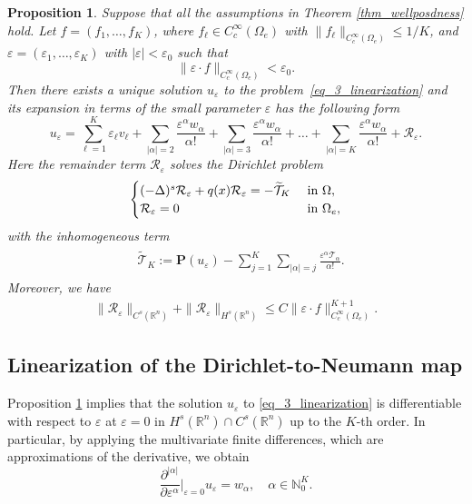 \documentclass [oneside,11pt] {amsart}
\numberwithin{equation}{section}
\newtheorem{prop}{Proposition}[section]
\newcommand{\R}{\mathbb{R}}
\newcommand{\p}{\partial}
\begin{document}
\begin{prop}\label{prop_linearization}Suppose that all the assumptions in Theorem \ref{thm_wellposdness} hold. 
Let $f=(f_1,\ldots,f_K)$, where $f_\ell\in C^\infty_c(\Omega_e)$ with $\|f_\ell\|_{C_c^\infty(\Omega_e)}\le 1/K$,
and $\varepsilon = (\varepsilon_1,\ldots,\varepsilon_K)$ with $|\varepsilon|<\varepsilon_0$ such that 
$$\|\varepsilon\cdot f\|_{C^\infty_c(\Omega_e)}<\varepsilon_0.$$
Then there exists a unique solution $u_\varepsilon$ to the problem~\eqref{eq_3_linearization} and its expansion in terms of the small parameter $\varepsilon$ has the following form 
\begin{equation}\label{eq_3_linear_u_expansion}
u_\varepsilon =  \sum_{\ell=1}^K\varepsilon_\ell v_\ell 
+ 
\sum_{|\alpha|=2}\frac{\varepsilon^\alpha w_\alpha}{\alpha!}
+ 
\sum_{|\alpha|=3}\frac{\varepsilon^\alpha w_\alpha}{\alpha!}+ \ldots+  \sum_{|\alpha|=K}\frac{\varepsilon^\alpha w_\alpha}{\alpha!}+\mathcal{R}_\varepsilon.
\end{equation}
Here the remainder term $\mathcal{R}_\varepsilon$ solves the Dirichlet problem 
\begin{align}\label{EQU_R}
\begin{cases}
(-\Delta)^s \mathcal{R}_\varepsilon + q(x)\mathcal{R}_\varepsilon =-\widetilde{\mathcal{T}}_{K} &\hbox{ in } \Omega,\\
\mathcal{R}_\varepsilon = 0 &\hbox{ in } \Omega_e,
\end{cases}
\end{align}
with the inhomogeneous term  
\begin{align*} 
\begin{aligned}
&\widetilde{\mathcal{T}}_{K} := \mathbf{P} (u_\varepsilon) -  \sum^K_{j=1} \sum_{|\alpha|=j}\frac{\varepsilon^\alpha \mathcal{T}_\alpha}{\alpha!}. 
\end{aligned}
\end{align*}
Moreover, we have 
\begin{align}\label{EST_R}
\|\mathcal{R}_\varepsilon\|_{C^{s}(\R^n)}+\|\mathcal{R}_\varepsilon\|_{H^{s}(\R^n)}\le  C\|\varepsilon\cdot f\|_{C^\infty_c(\Omega_e)}^{K+1}.
\end{align}
\end{prop}

\subsection{Linearization of the Dirichlet-to-Neumann map}
Proposition \ref{prop_linearization} implies that the solution $u_\varepsilon$ to \eqref{eq_3_linearization} is differentiable with respect to $\varepsilon$ at $\varepsilon = 0$ in $H^s(\R^n)\cap C^{s}(\R^n)$ up to the $K$-th order. 
In particular,  by applying the multivariate finite differences, which are approximations of the derivative, we obtain
\begin{equation}\label{eq:derivatives-of-uepsilon}
\frac{\p^{|\alpha|}}{\p \varepsilon^\alpha}
\Big|_{\varepsilon = 0}u_\varepsilon = w_\alpha,\quad \alpha\in \mathbb{N}^K_0.
\end{equation}
\end{document}
